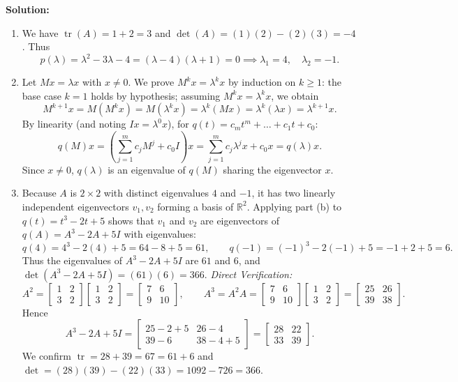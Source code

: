 \documentclass[11pt, letterpaper]{article}
\theoremstyle{definition}
\theoremstyle{remark}
\begin{document}
\textbf{Solution:}
\begin{enumerate}[label=(\alph*), topsep=3pt, itemsep=4pt]
    \item We have $\operatorname{tr}(A) = 1 + 2 = 3$ and $\det(A) = (1)(2) - (2)(3) = -4$. Thus
    \[
    p(\lambda) = \lambda^2 - 3\lambda - 4 = (\lambda - 4)(\lambda + 1) = 0 \implies \lambda_1 = 4, \quad \lambda_2 = -1.
    \]
    \item Let $Mx = \lambda x$ with $x \neq 0$. We prove $M^k x = \lambda^k x$ by induction on $k \ge 1$: the base case $k = 1$ holds by hypothesis; assuming $M^k x = \lambda^k x$, we obtain
    \[
    M^{k+1} x = M(M^k x) = M(\lambda^k x) = \lambda^k (Mx) = \lambda^k (\lambda x) = \lambda^{k+1} x.
    \]
    By linearity (and noting $Ix = \lambda^0 x$), for $q(t) = c_m t^m + \dots + c_1 t + c_0$:
    \[
    q(M)x = \left(\sum_{j=1}^{m} c_j M^j + c_0 I\right)x = \sum_{j=1}^{m} c_j \lambda^j x + c_0 x = q(\lambda)x.
    \]
    Since $x \neq 0$, $q(\lambda)$ is an eigenvalue of $q(M)$ sharing the eigenvector $x$.
    \item Because $A$ is $2 \times 2$ with distinct eigenvalues $4$ and $-1$, it has two linearly independent eigenvectors $v_1, v_2$ forming a basis of $\mathbb{R}^2$. Applying part (b) to $q(t) = t^3 - 2t + 5$ shows that $v_1$ and $v_2$ are eigenvectors of $q(A) = A^3 - 2A + 5I$ with eigenvalues:
    \[
    q(4) = 4^3 - 2(4) + 5 = 64 - 8 + 5 = 61, \qquad q(-1) = (-1)^3 - 2(-1) + 5 = -1 + 2 + 5 = 6.
    \]
    Thus the eigenvalues of $A^3 - 2A + 5I$ are $61$ and $6$, and $\det(A^3 - 2A + 5I) = (61)(6) = 366$.
    \textit{Direct Verification:}
    \[
    A^2 = \begin{bmatrix} 1 & 2 \\ 3 & 2 \end{bmatrix}\begin{bmatrix} 1 & 2 \\ 3 & 2 \end{bmatrix} = \begin{bmatrix} 7 & 6 \\ 9 & 10 \end{bmatrix}, \qquad
    A^3 = A^2 A = \begin{bmatrix} 7 & 6 \\ 9 & 10 \end{bmatrix}\begin{bmatrix} 1 & 2 \\ 3 & 2 \end{bmatrix} = \begin{bmatrix} 25 & 26 \\ 39 & 38 \end{bmatrix}.
    \]
    Hence
    \[
    A^3 - 2A + 5I = \begin{bmatrix} 25 - 2 + 5 & 26 - 4 \\ 39 - 6 & 38 - 4 + 5 \end{bmatrix} = \begin{bmatrix} 28 & 22 \\ 33 & 39 \end{bmatrix}.
    \]
    We confirm $\operatorname{tr} = 28 + 39 = 67 = 61 + 6$ and $\det = (28)(39) - (22)(33) = 1092 - 726 = 366$.
\end{enumerate}
\end{document}
